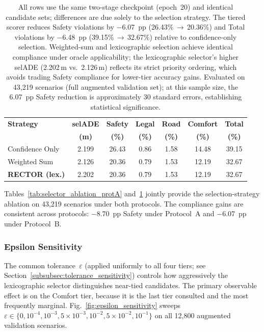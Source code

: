 \begin{table}[t]
\centering
\caption{Selector Ablation under Protocol~B (Full-28, Oracle, 43{,}219 Scenarios, Current Checkpoint)}
\label{tab:selector_ablation_protB}
\setlength{\tabcolsep}{3pt}
\begin{tabular}{lcccccc}
\toprule
\textbf{Strategy} & \textbf{selADE} & \textbf{Safety} & \textbf{Legal} & \textbf{Road} & \textbf{Comfort} & \textbf{Total} \\
 & \textbf{(m)} & \textbf{(\%)} & \textbf{(\%)} & \textbf{(\%)} & \textbf{(\%)} & \textbf{(\%)} \\
\midrule
Confidence Only & 2.199 & 26.43 & 0.86 & 1.58 & 14.48 & 39.15 \\
Weighted Sum & 2.126 & 20.36 & 0.79 & 1.53 & 12.19 & 32.67 \\
\textbf{RECTOR (lex.)} & 2.202 & 20.36 & 0.79 & 1.53 & 12.19 & 32.67 \\
\bottomrule
\end{tabular}
\vspace{1mm}
\caption*{\footnotesize All rows use the same two-stage checkpoint (epoch~20) and identical candidate sets; differences are due solely to the selection strategy.  The tiered scorer reduces Safety violations by $-$6.07~pp (26.43\%\,$\to$\,20.36\%) and Total violations by $-$6.48~pp (39.15\%\,$\to$\,32.67\%) relative to confidence-only selection.  Weighted-sum and lexicographic selection achieve identical compliance under oracle applicability; the lexicographic selector's higher selADE (2.202\,m vs.\ 2.126\,m) reflects its strict priority ordering, which avoids trading Safety compliance for lower-tier accuracy gains.  Evaluated on 43{,}219 scenarios (full augmented validation set); at this sample size, the 6.07~pp Safety reduction is approximately 30 standard errors, establishing statistical significance.}
\end{table}

Tables~\ref{tab:selector_ablation_protA} and~\ref{tab:selector_ablation_protB} jointly provide the selection-strategy ablation on 43{,}219 scenarios under both protocols.  The compliance gains are consistent across protocols: $-$8.70~pp Safety under Protocol~A and $-$6.07~pp under Protocol~B.

\subsubsection{Epsilon Sensitivity}
\label{subsubsec:epsilon_sensitivity}

The common tolerance~$\varepsilon$ (applied uniformly to all four tiers; see Section~\ref{subsubsec:tolerance_sensitivity}) controls how aggressively the lexicographic selector distinguishes near-tied candidates. The primary observable effect is on the Comfort tier, because it is the last tier consulted and the most frequently marginal. Fig.~\ref{fig:epsilon_sensitivity} sweeps $\varepsilon \in \{0, 10^{-4}, 10^{-3}, 5{\times}10^{-3}, 10^{-2}, 5{\times}10^{-2}, 10^{-1}\}$ on all 12{,}800 augmented validation scenarios.

